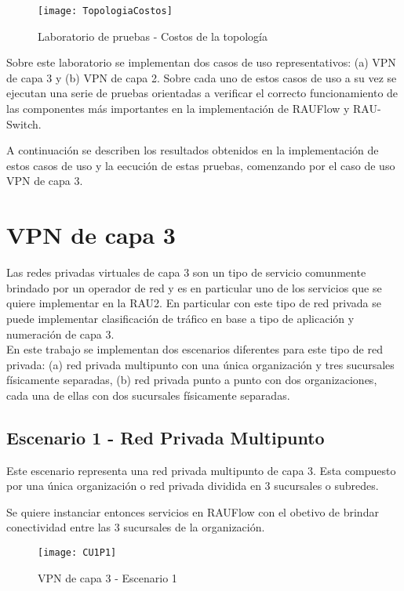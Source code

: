 \begin{figure}[ht!] 
\centering    
\texttt{[image: TopologiaCostos]}
\caption[Laboratorio de pruebas - Costos de la topolog\'ia]{Laboratorio de pruebas - Costos de la topolog\'ia}
\label{fig:LaboratorioDePruebasCostos}
\end{figure}

Sobre este laboratorio se implementan dos casos de uso representativos: (a) VPN de capa 3 y (b) VPN de capa 2. Sobre cada uno de estos casos de uso a su vez se ejecutan una serie de pruebas orientadas a verificar el correcto funcionamiento de las componentes m\'as importantes en la implementaci\'on de RAUFlow y RAU-Switch.

A continuaci\'on se describen los resultados obtenidos en la implementaci\'on de estos casos de uso y la eecuci\'on de estas pruebas, comenzando por el caso de uso VPN de capa 3.

\section{VPN de capa 3}

Las redes privadas virtuales de capa 3 son un tipo de servicio comunmente brindado por un operador de red y es en particular uno de los servicios que se quiere implementar en la RAU2. En particular con este tipo de red privada se puede implementar clasificaci\'on de tr\'afico en base a tipo de aplicaci\'on y numeraci\'on de capa 3.\\

En este trabajo se implementan dos escenarios diferentes para este tipo de red privada: (a) red privada multipunto con una \'unica organizaci\'on y tres sucursales f\'isicamente separadas, (b) red privada punto a punto con dos organizaciones, cada una de ellas con dos sucursales f\'isicamente separadas.

\subsection{Escenario 1 - Red Privada Multipunto}

Este escenario representa una red privada multipunto de capa 3. Esta compuesto por una \'unica organizaci\'on o red privada dividida en 3 sucursales o subredes.

Se quiere instanciar entonces servicios en RAUFlow con el obetivo de brindar conectividad entre las 3 sucursales de la organizaci\'on.

\begin{figure}[ht!] 
\centering    
\texttt{[image: CU1P1]}
\caption[VPN de capa 3 - Escenario 1]{VPN de capa 3 - Escenario 1}
\label{fig:CUP1}
\end{figure}

